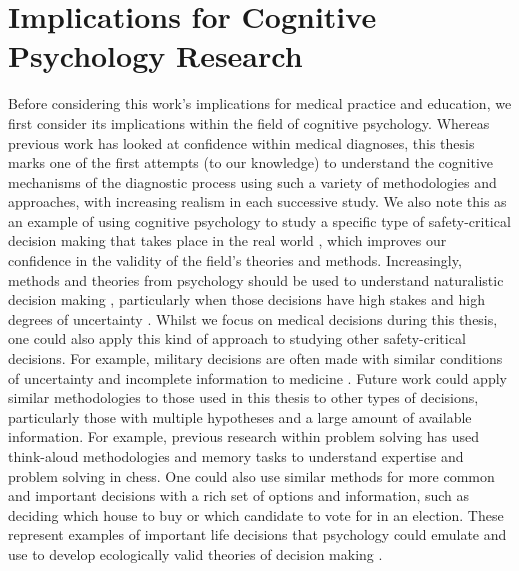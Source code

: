 \documentclass[a4paper, nobind]{templates/ociamthesis}
\begin{document}
\section{Implications for Cognitive Psychology Research}\label{implications-for-cognitive-psychology-research}

Before considering this work's implications for medical practice and education, we first consider its implications within the field of cognitive psychology. Whereas previous work has looked at confidence within medical diagnoses, this thesis marks one of the first attempts (to our knowledge) to understand the cognitive mechanisms of the diagnostic process using such a variety of methodologies and approaches, with increasing realism in each successive study. We also note this as an example of using cognitive psychology to study a specific type of safety-critical decision making that takes place in the real world \autocite{boag_evidence_2023}, which improves our confidence in the validity of the field's theories and methods. Increasingly, methods and theories from psychology should be used to understand naturalistic decision making \autocite{hunt_formalizing_2021}, particularly when those decisions have high stakes and high degrees of uncertainty \autocite{shortland_choice_2020}. Whilst we focus on medical decisions during this thesis, one could also apply this kind of approach to studying other safety-critical decisions. For example, military decisions are often made with similar conditions of uncertainty and incomplete information to medicine \autocite{zhou_information_2020}. Future work could apply similar methodologies to those used in this thesis to other types of decisions, particularly those with multiple hypotheses and a large amount of available information. For example, previous research within problem solving has used think-aloud methodologies \autocite{groot_thought_1978} and memory tasks \autocite{chase_perception_1973} to understand expertise and problem solving in chess. One could also use similar methods for more common and important decisions with a rich set of options and information, such as deciding which house to buy or which candidate to vote for in an election. These represent examples of important life decisions that psychology could emulate and use to develop ecologically valid theories of decision making \autocite{hechtlinger_psychology_2024}.
\end{document}
